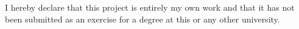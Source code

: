 I hereby declare that this project is entirely my own work and that it has not been submitted as an exercise for a degree at this or any other university.

\sign